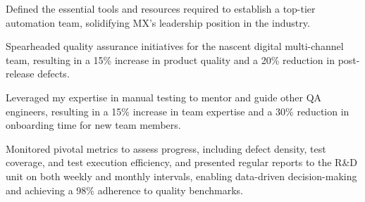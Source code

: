 \documentclass[]{deedy-resume-openfont}
\begin{document}
\begin{minipage}[t]{0.66\textwidth}
\begin{tightemize}
\item Defined the essential tools and resources required to establish a top-tier automation team, solidifying MX's leadership position in the industry.
\end{tightemize}
\sectionsep
{}
\vspace{\topsep} %
\begin{tightemize}
\item Spearheaded quality assurance initiatives for the nascent digital multi-channel team, resulting in a 15\% increase in product quality and a 20\% reduction in post-release defects.
\item Leveraged my expertise in manual testing to mentor and guide other QA engineers, resulting in a 15\% increase in team expertise and a 30\% reduction in onboarding time for new team members.
\item Monitored pivotal metrics to assess progress, including defect density, test coverage, and test execution efficiency, and presented regular reports to the R\&D unit on both weekly and monthly intervals, enabling data-driven decision-making and achieving a 98\% adherence to quality benchmarks.
\end{tightemize}
\end{minipage}
\end{document}
